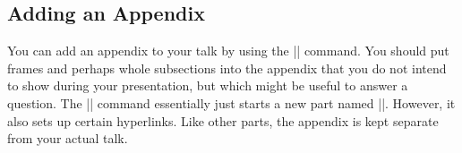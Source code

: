 \subsection{Adding an Appendix}

You can add an appendix to your talk by using the |\appendix| command. You should put frames and perhaps whole subsections into the appendix that you do not intend to show during your presentation, but which might be useful to answer a question. The |\appendix| command essentially just starts a new part named |\appendixname|. However, it also sets up certain hyperlinks. Like other parts, the appendix is kept separate from your actual talk.

